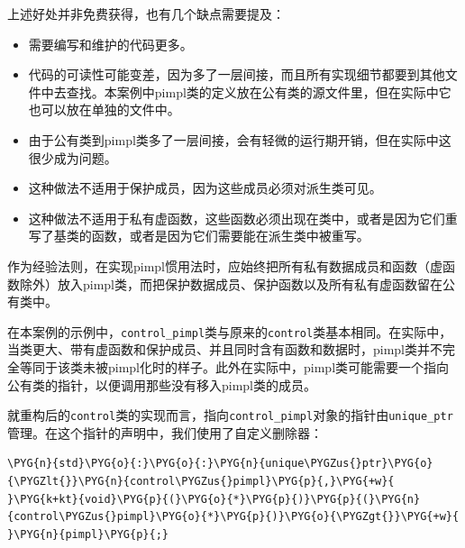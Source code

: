 
上述好处并非免费获得，也有几个缺点需要提及：



\begin{itemize}
\item 需要编写和维护的代码更多。



\item 代码的可读性可能变差，因为多了一层间接，而且所有实现细节都要到其他文件中去查找。本案例中pimpl类的定义放在公有类的源文件里，但在实际中它也可以放在单独的文件中。



\item 由于公有类到pimpl类多了一层间接，会有轻微的运行期开销，但在实际中这很少成为问题。



\item 这种做法不适用于保护成员，因为这些成员必须对派生类可见。



\item 这种做法不适用于私有虚函数，这些函数必须出现在类中，或者是因为它们重写了基类的函数，或者是因为它们需要能在派生类中被重写。

\end{itemize}



\begin{myNote}[tip]
作为经验法则，在实现pimpl惯用法时，应始终把所有私有数据成员和函数（虚函数除外）放入pimpl类，而把保护数据成员、保护函数以及所有私有虚函数留在公有类中。
\end{myNote}



在本案例的示例中，\texttt{control\_\allowbreak{}pimpl}类与原来的\texttt{control}类基本相同。在实际中，当类更大、带有虚函数和保护成员、并且同时含有函数和数据时，pimpl类并不完全等同于该类未被pimpl化时的样子。此外在实际中，pimpl类可能需要一个指向公有类的指针，以便调用那些没有移入pimpl类的成员。



就重构后的\texttt{control}类的实现而言，指向\texttt{control\_\allowbreak{}pimpl}对象的指针由\texttt{unique\_\allowbreak{}ptr}管理。在这个指针的声明中，我们使用了自定义删除器：



\begin{codeblockbg}
\begin{Verbatim}[commandchars=\\\{\},breaklines=true,breakanywhere=true,fontsize=\codefont,xleftmargin=17bp]
\PYG{n}{std}\PYG{o}{:}\PYG{o}{:}\PYG{n}{unique\PYGZus{}ptr}\PYG{o}{\PYGZlt{}}\PYG{n}{control\PYGZus{}pimpl}\PYG{p}{,}\PYG{+w}{ }\PYG{k+kt}{void}\PYG{p}{(}\PYG{o}{*}\PYG{p}{)}\PYG{p}{(}\PYG{n}{control\PYGZus{}pimpl}\PYG{o}{*}\PYG{p}{)}\PYG{o}{\PYGZgt{}}\PYG{+w}{ }\PYG{n}{pimpl}\PYG{p}{;}
\end{Verbatim}
\end{codeblockbg}


